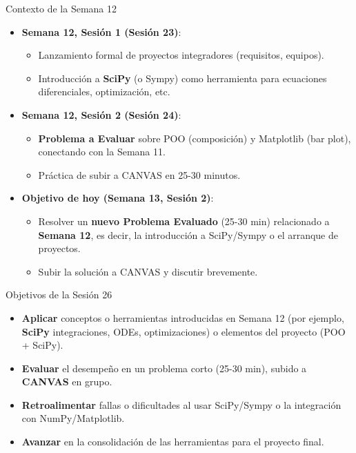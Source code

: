 \documentclass[10pt]{beamer}
\begin{document}
\begin{frame}{Contexto de la Semana 12}
  \begin{itemize}
    \item \textbf{Semana 12, Sesión 1 (Sesión 23)}:
      \begin{itemize}
        \item Lanzamiento formal de proyectos integradores (requisitos, equipos).
        \item Introducción a \textbf{SciPy} (o Sympy) como herramienta para ecuaciones diferenciales, optimización, etc.
      \end{itemize}
    \item \textbf{Semana 12, Sesión 2 (Sesión 24)}:
      \begin{itemize}
        \item \textbf{Problema a Evaluar} sobre POO (composición) y Matplotlib (bar plot), conectando con la Semana 11.
        \item Práctica de subir a CANVAS en 25-30 minutos.
      \end{itemize}
    \item \textbf{Objetivo de hoy (Semana 13, Sesión 2)}:
      \begin{itemize}
        \item Resolver un \textbf{nuevo Problema Evaluado} (25-30 min) relacionado a \textbf{Semana 12}, es decir, la introducción a SciPy/Sympy o el arranque de proyectos.
        \item Subir la solución a CANVAS y discutir brevemente.
      \end{itemize}
  \end{itemize}
\end{frame}

\begin{frame}{Objetivos de la Sesión 26}
  \begin{itemize}
    \item \textbf{Aplicar} conceptos o herramientas introducidas en Semana 12 (por ejemplo, \textbf{SciPy} integraciones, ODEs, optimizaciones) o elementos del proyecto (POO + SciPy).
    \item \textbf{Evaluar} el desempeño en un problema corto (25-30 min), subido a \textbf{CANVAS} en grupo.
    \item \textbf{Retroalimentar} fallas o dificultades al usar SciPy/Sympy o la integración con NumPy/Matplotlib.
    \item \textbf{Avanzar} en la consolidación de las herramientas para el proyecto final.
  \end{itemize}
\end{frame}
\end{document}
